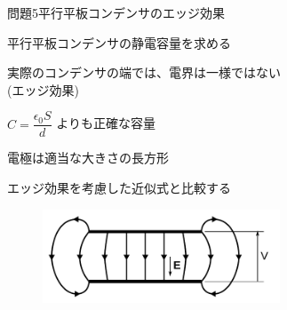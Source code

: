 \documentclass[dvipdfmx]{beamer}
\newenvironment{wideitemize}{\itemize\setlength{\itemsep}{1em}}{\enditemize}
\newenvironment{wideitemize2}{\itemize\setlength{\itemsep}{0.2em}}{\enditemize}
\begin{document}

\begin{frame}{問題5}{平行平板コンデンサのエッジ効果}
\begin{wideitemize}
\item 平行平板コンデンサの静電容量を求める
\begin{wideitemize2}
\item 実際のコンデンサの端では、電界は一様ではない \\
(エッジ効果)
\item $C=\dfrac{\epsilon_0 S}{d}$ よりも正確な容量
\item 電極は適当な大きさの長方形
\item エッジ効果を考慮した近似式と比較する
\end{wideitemize2}
\end{wideitemize}

\begin{figure}[htbp]
    \centering
    \includegraphics[width=200pt]{svg/capacitor.pdf}
\end{figure}
\end{frame}

\end{document}
